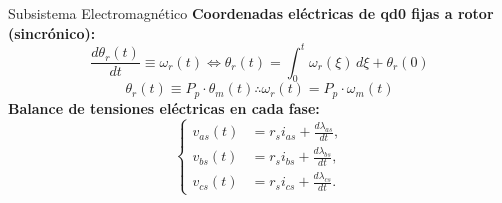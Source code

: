 \documentclass[12pt]{beamer}
\begin{document}
\begin{frame}{Subsistema Electromagnético}\footnotesize
    \textbf{Coordenadas eléctricas de qd0 fijas a rotor (sincrónico):}
    \begin{equation}
    \frac{d\theta_r(t)}{dt} \equiv \omega_r(t) \iff \theta_r(t) = \int_{0}^{t} \omega_r(\xi) \, d\xi + \theta_r(0)
    \end{equation}
    \begin{equation}
    \theta_r(t) \equiv P_p \cdot \theta_m(t) \therefore \omega_r(t) = P_p \cdot \omega_m(t)
    \end{equation}
    \textbf{Balance de tensiones eléctricas en cada fase:}
    \begin{equation}
    \left\{
    \begin{aligned}
        v_{as}(t) &= r_s i_{as} + \frac{d\lambda_{as}}{dt}, \\
        v_{bs}(t) &= r_s i_{bs} + \frac{d\lambda_{bs}}{dt}, \\
        v_{cs}(t) &= r_s i_{cs} + \frac{d\lambda_{cs}}{dt}.
    \end{aligned}
    \right.
    \end{equation}
\end{frame}
\end{document}
